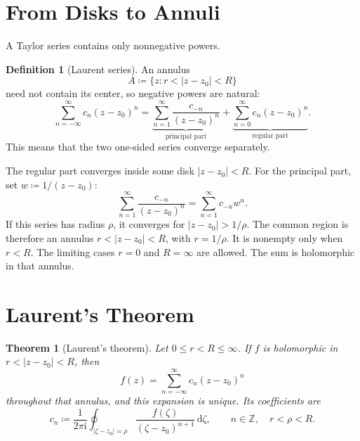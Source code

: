 \documentclass[11pt,a4paper]{article}
\theoremstyle{definition}
\newtheorem{definition}{Definition}
\theoremstyle{plain}
\newtheorem{theorem}{Theorem}
\newcommand{\dd}{\,\mathrm{d}}
\begin{document}
\section{From Disks to Annuli}
A Taylor series contains only nonnegative powers. \begin{definition}[Laurent series]
An annulus
\begin{equation}\label{eq:02}
A\coloneqq\{z:r<|z-z_0|<R\}
\end{equation}
need not contain its center, so negative powers are natural:
\begin{equation}\label{eq:03}
\sum_{n=-\infty}^{\infty}c_n(z-z_0)^n
 =\underbrace{\sum_{n=1}^{\infty}\frac{c_{-n}}{(z-z_0)^n}}
              _{\text{principal part}}
  +\underbrace{\sum_{n=0}^{\infty}c_n(z-z_0)^n}
              _{\text{regular part}}.
\end{equation}
This means that the two one-sided series converge separately.
\end{definition}


The regular part converges inside some disk $|z-z_0|<R$. For the
principal part, set $w\coloneqq1/(z-z_0)$:
\begin{equation}\label{eq:04}
\sum_{n=1}^{\infty}\frac{c_{-n}}{(z-z_0)^n}
 =\sum_{n=1}^{\infty}c_{-n}w^n.
\end{equation}
If this series has radius $\rho$, it converges for
$|z-z_0|>1/\rho$. The common region is therefore an annulus
$r<|z-z_0|<R$, with $r=1/\rho$. It is nonempty only when $r<R$.
The limiting cases $r=0$ and $R=\infty$ are allowed.
The sum is holomorphic in that annulus.

\section{Laurent's Theorem}
\begin{theorem}[Laurent's theorem]
Let $0\leq r<R\leq\infty$. If $f$ is holomorphic in $r<|z-z_0|<R$, then
\begin{equation}\label{eq:05}
\boxed{f(z)=\sum_{n=-\infty}^{\infty}c_n(z-z_0)^n}
\end{equation}
throughout that annulus, and this expansion is unique. Its coefficients are
\begin{equation}\label{eq:06}
\boxed{c_n\coloneqq \frac1{2\pi \mathrm{i}}\oint_{|\zeta-z_0|=\rho}
             \frac{f(\zeta)}{(\zeta-z_0)^{n+1}}\dd\zeta,
       \qquad n\in\mathbb Z,\quad r<\rho<R.}
\end{equation}
\end{theorem}
\end{document}
